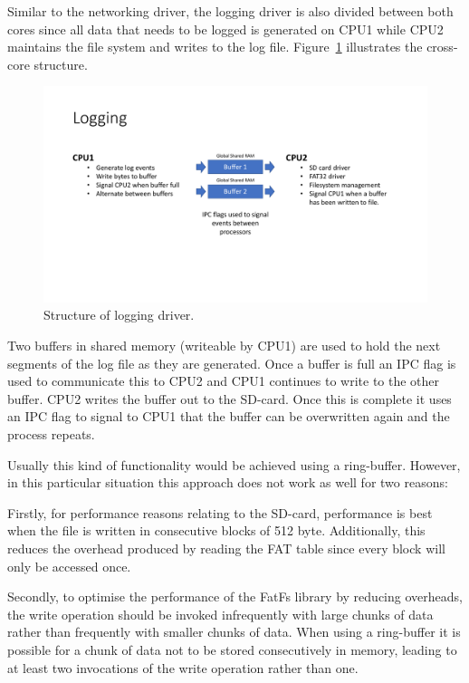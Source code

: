 Similar to the networking driver, the logging driver is also divided between both cores since all data that needs to be logged is generated on CPU1 while CPU2 maintains the file system and writes to the log file. Figure~\ref{fig:logging_structure} illustrates the cross-core structure.

\begin{figure}[H]
    \centering \includegraphics[width=1.0\textwidth]{./figures/logging_structure.pdf}
    \caption{Structure of logging driver.}
    \label{fig:logging_structure}
\end{figure}

Two buffers in shared memory (writeable by CPU1) are used to hold the next segments of the log file as they are generated. Once a buffer is full an IPC flag is used to communicate this to CPU2 and CPU1 continues to write to the other buffer. CPU2 writes the buffer out to the SD-card. Once this is complete it uses an IPC flag to signal to CPU1 that the buffer can be overwritten again and the process repeats.

Usually this kind of functionality would be achieved using a ring-buffer. However, in this particular situation this approach does not work as well for two reasons:

Firstly, for performance reasons relating to the SD-card, performance is best when the file is written in consecutive blocks of 512 byte. Additionally, this reduces the overhead produced by reading the FAT table since every block will only be accessed once.

Secondly, to optimise the performance of the FatFs library by reducing overheads, the write operation should be invoked infrequently with large chunks of data rather than frequently with smaller chunks of data. When using a ring-buffer it is possible for a chunk of data not to be stored consecutively in memory, leading to at least two invocations of the write operation rather than one.

